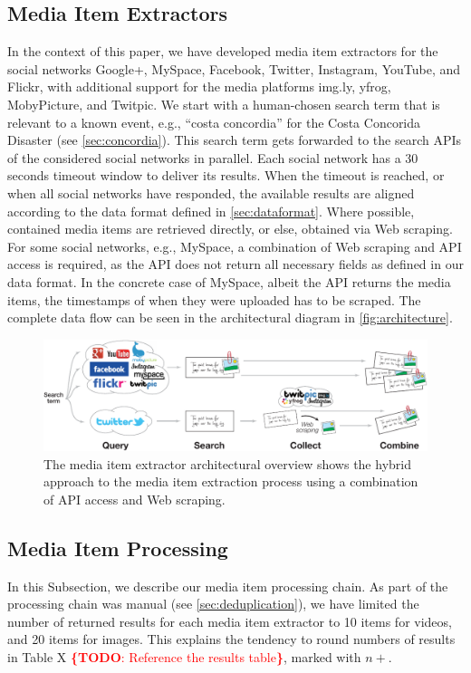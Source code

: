 \documentclass{acm_proc_article-sp}
\newcommand{\todo}[1]{\noindent\textcolor{red}{{\bf \{TODO}: #1{\bf \}}}}
\begin{document}
\subsection{Media Item Extractors}
In the context of this paper, we have developed media item extractors for the social networks Google+, MySpace, Facebook, Twitter, Instagram, YouTube, and Flickr,
with additional support for the media platforms img.ly, yfrog, MobyPicture, and Twitpic.
We start with a human-chosen search term that is relevant to a known event, e.g., ``costa concordia'' for the Costa Concorida Disaster (see \autoref{sec:concordia}).
This search term gets forwarded to the search APIs of the considered social networks in parallel.
Each social network has a 30 seconds timeout window to deliver its results.
When the timeout is reached, or when all social networks have responded,
the available results are aligned according to the data format defined in \autoref{sec:dataformat}.
Where possible, contained media items are retrieved directly,
or else, obtained via Web scraping.
For some social networks, e.g., MySpace, a combination of Web scraping and API access is required,
as the API does not return all necessary fields as defined in our data format.
In the concrete case of MySpace, albeit the API returns the media items,
the timestamps of when they were uploaded has to be scraped.
The complete data flow can be seen in the architectural diagram in \autoref{fig:architecture}. 

\begin{figure}
\centering
\includegraphics[width=1.0\linewidth]{./resources/architecture.pdf}
\caption{The media item extractor architectural overview shows the hybrid approach to the media item extraction process using a combination of API access and Web scraping.}
\label{fig:architecture}
\end{figure}

\subsection{Media Item Processing}
In this Subsection, we describe our media item processing chain.
As part of the processing chain was manual (see \autoref{sec:deduplication}),
we have limited the number of returned results for each media item extractor to 10 items for videos, and 20 items for images.
This explains the tendency to round numbers of results in Table X \todo{Reference the results table}, marked with $n+$.
\end{document}

